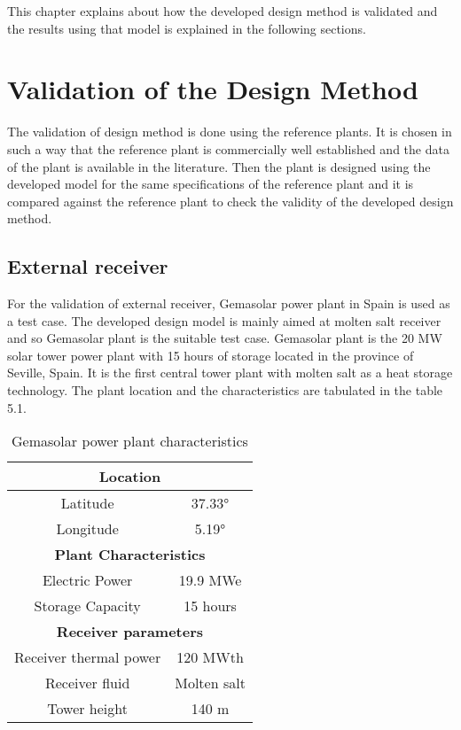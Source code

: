 This chapter explains about how the developed design method is validated and the results using that model is explained in the following sections. 
\section{Validation of the Design Method} 
The validation of design method is done using the reference plants. It is chosen in such a way that the reference plant is commercially well established and the data of the plant is available in the literature. Then the plant is designed using the developed model for the same specifications of the reference plant and it is compared against the reference plant to check the validity of the developed design method.  
\subsection{External receiver}
For the validation of external receiver, Gemasolar power plant in Spain is used as a test case. The developed design model is mainly aimed at molten salt receiver and so Gemasolar plant is the suitable test case. Gemasolar plant is the 20 MW solar tower power plant with 15 hours of storage located in the province of Seville, Spain. It is the first central tower plant with molten salt as a heat storage technology. The plant location and the characteristics are tabulated in the table 5.1.
\begin{table}[h!]
	\begin{center}
		\begin{tabular}{ |c|c|} 
			\hline
			\multicolumn{2}{|c|}{\textbf{Location}} \\
			\hline
			Latitude & 37.33°\\
			\hline
			Longitude & 5.19° \\
			\hline
			\multicolumn{2}{|c|}{\textbf{Plant Characteristics}} \\
			\hline
			Electric Power & 19.9 MWe \\
			\hline
			Storage Capacity & 15 hours \\
			\hline
			\multicolumn{2}{|c|}{\textbf{Receiver parameters}} \\
			\hline
			Receiver thermal power & 120 MWth \\
			\hline
			Receiver fluid & Molten salt \\
			\hline
			Tower height & 140 m \\
			\hline
		\end{tabular}
		\caption{Gemasolar power plant characteristics}
		\label{Gemasolar plant characteristics}
	\end{center}
\end{table}
